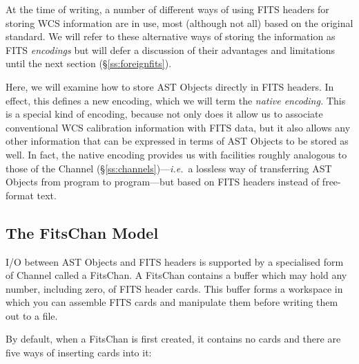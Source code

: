 \documentclass[twoside,11pt]{article}
\newcommand{\secref}[1]{\S\ref{#1}}
\newcommand{\secref}[1]{\ref{#1}}
\begin{document}
At the time of writing, a number of different ways of using FITS
headers for storing WCS information are in use, most (although not
all) based on the original standard. We will refer to these
alternative ways of storing the information as FITS {\em{encodings}}
but will defer a discussion of their advantages and limitations until
the next section (\secref{ss:foreignfits}).

Here, we will examine how to store AST Objects directly in FITS
headers. In effect, this defines a new encoding, which we will term
the {\em{native encoding.}} This is a special kind of encoding,
because not only does it allow us to associate conventional
WCS calibration information with FITS data, but it also allows any other
information that can be expressed in terms of AST Objects to be stored
as well.  In fact, the native encoding provides us with facilities
roughly analogous to those of the Channel
(\secref{ss:channels})---{\em{i.e.}}\ a lossless way of
transferring AST Objects from program to program---but based on FITS
headers instead of free-format text.

\subsection{The FitsChan Model}

I/O between AST Objects and FITS headers is supported by a specialised
form of Channel called a FitsChan. A FitsChan contains a buffer which
may hold any number, including zero, of FITS header cards. This buffer
forms a workspace in which you can assemble FITS cards and manipulate
them before writing them out to a file.

By default, when a FitsChan is first created, it contains no cards and
there are five ways of inserting cards into it:
\end{document}
